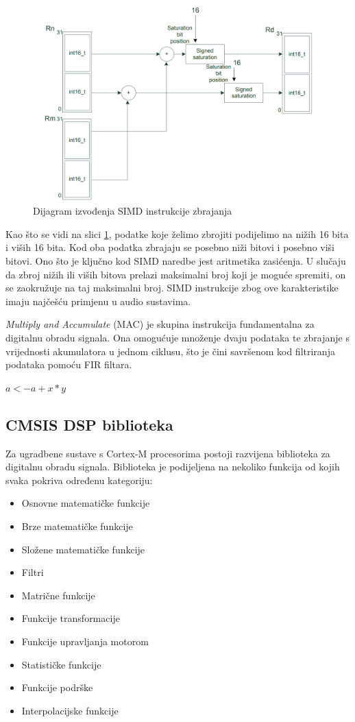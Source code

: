 \documentclass[times, utf8, diplomski]{fer}
\begin{document}
\begin{figure}[hbt!]
 \centering
 \includegraphics[scale=0.4]{photos/simd.png}
 \caption{Dijagram izvođenja SIMD instrukcije zbrajanja}
 \label{SIMD}
\end{figure}

Kao što se vidi na slici \ref{SIMD}, podatke koje želimo zbrojiti podijelimo na nižih 16 bita i viših 16 bita. Kod oba podatka zbrajaju se posebno niži bitovi i posebno viši bitovi. Ono što je ključno kod SIMD naredbe jest aritmetika zasićenja. U slučaju da zbroj nižih ili viših bitova prelazi maksimalni broj koji je moguće spremiti, on se zaokružuje na taj maksimalni broj. SIMD instrukcije zbog ove karakteristike imaju najčešću primjenu u audio sustavima.

\textit{Multiply and Accumulate} (MAC) je skupina instrukcija fundamentalna za digitalnu obradu signala. Ona omogućuje množenje dvaju podataka te zbrajanje s vrijednosti akumulatora u jednom ciklusu, što je čini savršenom kod filtriranja podataka pomoću FIR filtara.

$a <- a + x * y$

\subsection{CMSIS DSP biblioteka}
Za ugradbene sustave s Cortex-M procesorima postoji razvijena biblioteka za digitalnu obradu signala. Biblioteka je podijeljena na nekoliko funkcija od kojih svaka pokriva određenu kategoriju:

\begin{itemize}
\item Osnovne matematičke funkcije
\item Brze matematičke funkcije
\item Složene matematičke funkcije
\item Filtri
\item Matrične funkcije
\item Funkcije transformacije
\item Funkcije upravljanja motorom
\item Statističke funkcije
\item Funkcije podrške
\item Interpolacijske funkcije
\end{itemize}
\end{document}
